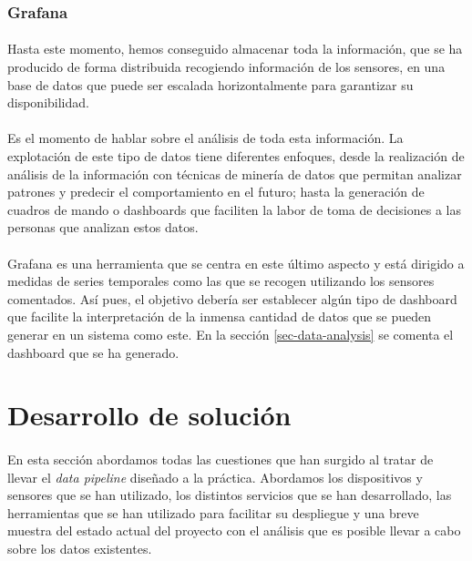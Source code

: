 \documentclass[12pt, a4paper]{article}
\begin{document}
        \subsubsection{Grafana}
        
        \paragraph{}
        Hasta este momento, hemos conseguido almacenar toda la información, que se ha producido de forma distribuida recogiendo información de los sensores, en una base de datos que puede ser escalada horizontalmente para garantizar su disponibilidad.

        \paragraph{}
        Es el momento de hablar sobre el análisis de toda esta información. La explotación de este tipo de datos tiene diferentes enfoques, desde la realización de análisis de la información con técnicas de minería de datos que permitan analizar patrones y predecir el comportamiento en el futuro; hasta la generación de cuadros de mando o dashboards que faciliten la labor de toma de decisiones a las personas que analizan estos datos.

        \paragraph{}
        Grafana es una herramienta que se centra en este último aspecto y está dirigido a medidas de series temporales como las que se recogen utilizando los sensores comentados. Así pues, el objetivo debería ser establecer algún tipo de dashboard que facilite la interpretación de la inmensa cantidad de datos que se pueden generar en un sistema como este. En la sección \ref{sec-data-analysis} se comenta el dashboard que se ha generado. 

        \section{Desarrollo de solución}

        \paragraph{}
        En esta sección abordamos todas las cuestiones que han surgido al tratar de llevar el \textit{data pipeline} diseñado a la práctica. Abordamos los dispositivos y sensores que se han utilizado, los distintos servicios que se han desarrollado, las herramientas que se han utilizado para facilitar su despliegue y una breve muestra del estado actual del proyecto con el análisis que es posible llevar a cabo sobre los datos existentes.
\end{document}
